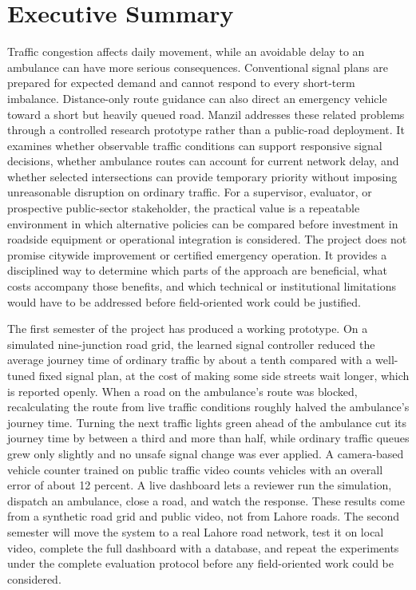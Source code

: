 \documentclass{../FYPFast/FastFyp}
\begin{document}
\cleardoublepage
\thispagestyle{empty}
\section*{Executive Summary}
Traffic congestion affects daily movement, while an avoidable delay to an ambulance can have more serious consequences. Conventional signal plans are prepared for expected demand and cannot respond to every short-term imbalance. Distance-only route guidance can also direct an emergency vehicle toward a short but heavily queued road. Manzil addresses these related problems through a controlled research prototype rather than a public-road deployment. It examines whether observable traffic conditions can support responsive signal decisions, whether ambulance routes can account for current network delay, and whether selected intersections can provide temporary priority without imposing unreasonable disruption on ordinary traffic. For a supervisor, evaluator, or prospective public-sector stakeholder, the practical value is a repeatable environment in which alternative policies can be compared before investment in roadside equipment or operational integration is considered. The project does not promise citywide improvement or certified emergency operation. It provides a disciplined way to determine which parts of the approach are beneficial, what costs accompany those benefits, and which technical or institutional limitations would have to be addressed before field-oriented work could be justified.

The first semester of the project has produced a working prototype. On a simulated nine-junction road grid, the learned signal controller reduced the average journey time of ordinary traffic by about a tenth compared with a well-tuned fixed signal plan, at the cost of making some side streets wait longer, which is reported openly. When a road on the ambulance's route was blocked, recalculating the route from live traffic conditions roughly halved the ambulance's journey time. Turning the next traffic lights green ahead of the ambulance cut its journey time by between a third and more than half, while ordinary traffic queues grew only slightly and no unsafe signal change was ever applied. A camera-based vehicle counter trained on public traffic video counts vehicles with an overall error of about 12 percent. A live dashboard lets a reviewer run the simulation, dispatch an ambulance, close a road, and watch the response. These results come from a synthetic road grid and public video, not from Lahore roads. The second semester will move the system to a real Lahore road network, test it on local video, complete the full dashboard with a database, and repeat the experiments under the complete evaluation protocol before any field-oriented work could be considered.
\end{document}
